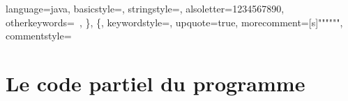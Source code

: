 \documentclass[a4paper,12pt]{report}
\begin{document}

\lstset{language=Java}
\lstset
{
	language=java,
	basicstyle=\ttfamily\footnotesize,
	stringstyle=\color{red},
	alsoletter={1234567890},
	otherkeywords={\ , \}, \{},
	keywordstyle=\color{blue},
	upquote=true,
	morecomment=[s]{"""}{"""},
	commentstyle=\color{gray}\slshape
}

\part{Le code partiel du programme}
	\setcounter{chapter}{0}
	
	
\end{document}
